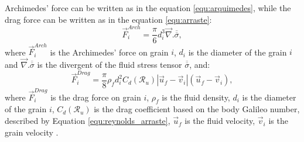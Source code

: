     Archimedes' force can be written as in the equation \ref{equ:arquimedes}, while the drag force can be written as in the equation \ref{equ:arraste}: 
\begin{equation}
    \vec{F}_{i}^{Arch} = \frac{\pi}{6} d_{i}^{3} \vec{\nabla}.\overline{\overline{\sigma}},
    \label{equ:arquimedes}
\end{equation}
where  $\vec{F}_{i}^{Arch}$ is the Archimedes' force on grain $i$, $d_i$ is the diameter of the grain $i$ and $\vec{\nabla}.\overline{\overline{\sigma}}$ is the divergent of the fluid stress tensor $\overline{\overline{\sigma}}$, and:
\begin{equation}
    \vec{F}_{i}^{Drag} = \frac{\pi}{8}\rho_{f}d_{i}^{2}C_{d}(\mathcal{R}_{u})\left|\vec{u}_{f}-\vec{v}_{i}\right|(\vec{u}_{f}-\vec{v}_{i}),
    \label{equ:arraste}
\end{equation}
where $\vec{F}_{i}^{Drag}$ is the drag force on grain $i$, $\rho_f$ is the fluid density, $d_i$ is the diameter of the grain $i$, $C_{d}(\mathcal{R}_{u})$ is the drag coefficient based on the body Galileo number, described by Equation \ref{equ:reynolds_arraste}, $\vec{u}_{f}$ is the fluid velocity, $\vec{v}_{i}$ is the grain velocity \cite{Numerical_simulation_of_turbulent_sediment_transport}.

